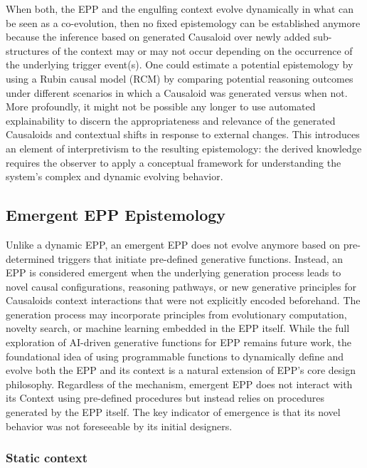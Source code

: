 \documentclass{article}
\begin{document}
When both, the EPP and the engulfing context evolve dynamically in what can be seen as a co-evolution, then no fixed epistemology can be established anymore because the inference based on generated Causaloid over newly added sub-structures of the context may or may not occur depending on the occurrence of the underlying trigger event(s). One could estimate a potential epistemology by using a Rubin causal model\cite{rubin2005causal} (RCM) by comparing potential reasoning outcomes under different scenarios in which a Causaloid was generated versus when not. More profoundly, it might not be possible any longer to use automated explainability to discern the appropriateness and relevance of the generated Causaloids and contextual shifts in response to external changes. This introduces an element of interpretivism to the resulting epistemology: the derived knowledge requires the observer to apply a conceptual framework for understanding the system's complex and dynamic evolving behavior.

\subsection{Emergent EPP Epistemology}
\label{subsec:Emergent_EPP}

Unlike a dynamic EPP, an emergent EPP does not evolve anymore based on pre-determined triggers that initiate pre-defined generative functions. Instead, an EPP is considered emergent when the underlying generation process leads to novel causal configurations, reasoning pathways, or new generative principles for Causaloids context interactions that were not explicitly encoded beforehand.
The generation process may incorporate principles from evolutionary computation, novelty search, or machine learning embedded in the EPP itself. While the full exploration of AI-driven generative functions for EPP remains future work, the foundational idea of using programmable functions to dynamically define and evolve both the EPP and its context is a natural extension of EPP's core design philosophy. Regardless of the mechanism, emergent EPP does not interact with its Context using pre-defined procedures but instead relies on procedures generated by the EPP itself. The key indicator of emergence is that its novel behavior was not foreseeable by its initial designers.

\subsubsection{Static context}
\end{document}
